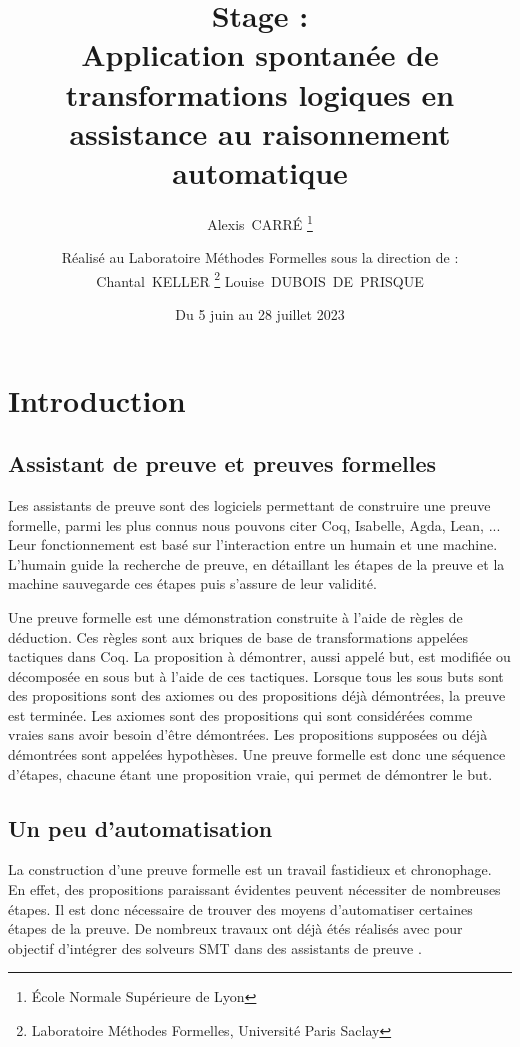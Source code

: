 \documentclass[titlepage,draft]{article}
\title{
    Stage :\\[1em]
    Application spontanée de transformations logiques en assistance au raisonnement automatique
}
\date{Du 5 juin au 28 juillet 2023}
\author{
    Alexis~CARRÉ \thanks{École Normale Supérieure de Lyon}
    \vspace{1em}
    \and
    Réalisé au Laboratoire Méthodes Formelles sous la direction de :\\[1em]
    Chantal~KELLER \thanks{Laboratoire Méthodes Formelles, Université Paris Saclay}
    \hspace{1em}
    Louise~DUBOIS~DE~PRISQUE\footnotemark[2]
    \vspace{2em}
}
\begin{document}
\maketitle

\tableofcontents
\newpage

\section{Introduction}
\subsection{Assistant de preuve et preuves formelles}
Les assistants de preuve sont des logiciels permettant de construire une preuve formelle, parmi les plus connus nous pouvons citer Coq, Isabelle, Agda, Lean, ... Leur fonctionnement est basé sur l'interaction entre un humain et une machine. L'humain guide la recherche de preuve, en détaillant les étapes de la preuve et la machine sauvegarde ces étapes puis s'assure de leur validité.

Une preuve formelle est une démonstration construite à l'aide de règles de déduction. Ces règles sont aux briques de base de transformations appelées tactiques dans Coq. La proposition à démontrer, aussi appelé but, est modifiée ou décomposée en sous but à l'aide de ces tactiques. Lorsque tous les sous buts sont des propositions sont des axiomes ou des propositions déjà démontrées, la preuve est terminée. Les axiomes sont des propositions qui sont considérées comme vraies sans avoir besoin d'être démontrées. Les propositions supposées ou déjà démontrées sont appelées hypothèses. Une preuve formelle est donc une séquence d'étapes, chacune étant une proposition vraie, qui permet de démontrer le but.

\subsection{Un peu d'automatisation}
La construction d'une preuve formelle est un travail fastidieux et chronophage. En effet, des propositions paraissant évidentes peuvent nécessiter de nombreuses étapes. Il est donc nécessaire de trouver des moyens d'automatiser certaines étapes de la preuve. De nombreux travaux ont déjà étés réalisés avec pour objectif d'intégrer des solveurs SMT dans des assistants de preuve \cite{DBLP:conf/cpp/ArmandFGKTW11}.
\end{document}

